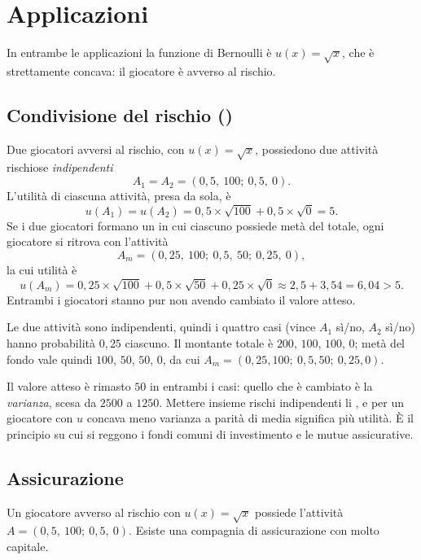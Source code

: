 \section{Applicazioni}

In entrambe le applicazioni la funzione di Bernoulli è $u(x) = \sqrt{x}$, che è
strettamente concava: il giocatore è avverso al rischio.

\subsection{Condivisione del rischio ()}

Due giocatori avversi al rischio, con $u(x) = \sqrt{x}$, possiedono due attività
rischiose \emph{indipendenti}
\[
  A_1 = A_2 = (0{,}5,\ 100;\ 0{,}5,\ 0).
\]
L'utilità di ciascuna attività, presa da sola, è
\[
  u(A_1) = u(A_2) = 0{,}5 \times \sqrt{100} + 0{,}5 \times \sqrt{0} = 5 .
\]
Se i due giocatori formano un  in cui ciascuno possiede metà del totale,
ogni giocatore si ritrova con l'attività
\[
  A_m = (0{,}25,\ 100;\ 0{,}5,\ 50;\ 0{,}25,\ 0),
\]
la cui utilità è
\[
  u(A_m) = 0{,}25 \times \sqrt{100} + 0{,}5 \times \sqrt{50} + 0{,}25 \times \sqrt{0}
         \approx 2{,}5 + 3{,}54 = 6{,}04 > 5 .
\]
Entrambi i giocatori stanno  pur non avendo cambiato il valore atteso.

\begin{extra}
Le due attività sono indipendenti, quindi i quattro casi (vince $A_1$ sì/no, $A_2$ sì/no)
hanno probabilità $0{,}25$ ciascuno. Il montante totale è $200$, $100$, $100$, $0$; metà
del fondo vale quindi $100$, $50$, $50$, $0$, da cui
$A_m = (0{,}25,100;\ 0{,}5,50;\ 0{,}25,0)$.

Il valore atteso è rimasto $50$ in entrambi i casi: quello che è cambiato è la
\emph{varianza}, scesa da $2500$ a $1250$. Mettere insieme rischi indipendenti li
, e per un giocatore con $u$ concava meno varianza a parità di media
significa più utilità. È il principio su cui si reggono i fondi comuni di investimento
e le mutue assicurative.
\end{extra}

\subsection{Assicurazione}

Un giocatore avverso al rischio con $u(x) = \sqrt{x}$ possiede l'attività
$A = (0{,}5,\ 100;\ 0{,}5,\ 0)$. Esiste una compagnia di assicurazione  con molto capitale.

